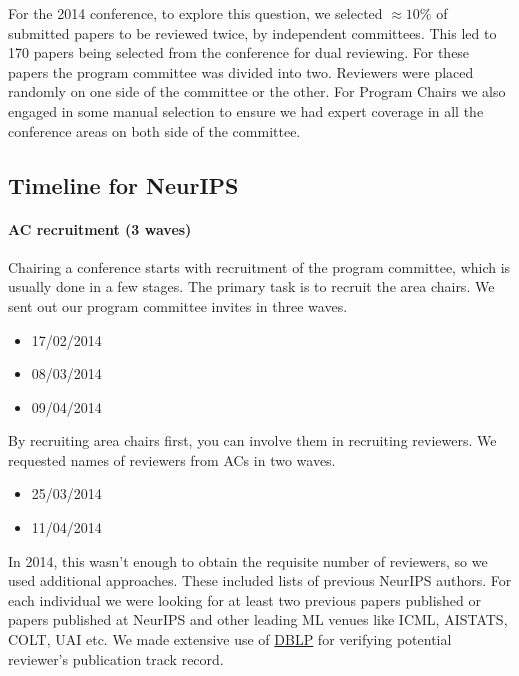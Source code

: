 \documentclass[a4paperpaper,]{article}
\providecommand{\tightlist}{%
  \setlength{\itemsep}{0pt}\setlength{\parskip}{0pt}}
\begin{document}
For the 2014 conference, to explore this question, we selected
\(\approx 10\%\) of submitted papers to be reviewed twice, by
independent committees. This led to 170 papers being selected from the
conference for dual reviewing. For these papers the program committee
was divided into two. Reviewers were placed randomly on one side of the
committee or the other. For Program Chairs we also engaged in some
manual selection to ensure we had expert coverage in all the conference
areas on both side of the committee.

\hypertarget{timeline-for-neurips}{%
\subsection{Timeline for NeurIPS}\label{timeline-for-neurips}}

\begin{flushright}
\end{flushright}

\paragraph{AC recruitment (3 waves)}

Chairing a conference starts with recruitment of the program committee,
which is usually done in a few stages. The primary task is to recruit
the area chairs. We sent out our program committee invites in three
waves.

\begin{itemize}
\tightlist
\item
  17/02/2014
\item
  08/03/2014
\item
  09/04/2014
\end{itemize}

By recruiting area chairs first, you can involve them in recruiting
reviewers. We requested names of reviewers from ACs in two waves.

\begin{itemize}
\tightlist
\item
  25/03/2014
\item
  11/04/2014
\end{itemize}

In 2014, this wasn't enough to obtain the requisite number of reviewers,
so we used additional approaches. These included lists of previous
NeurIPS authors. For each individual we were looking for at least two
previous papers published or papers published at NeurIPS and other
leading ML venues like ICML, AISTATS, COLT, UAI etc. We made extensive
use of \href{https://dblp.uni-trier.de/}{DBLP} for verifying potential
reviewer's publication track record.
\end{document}
